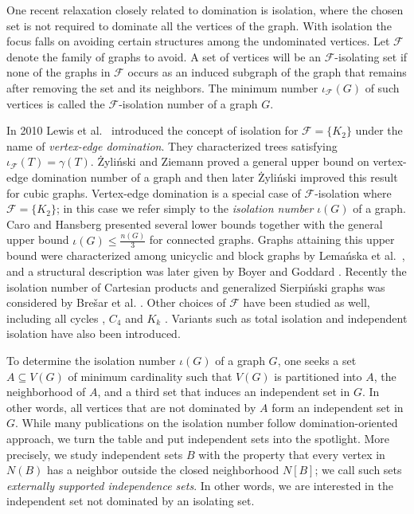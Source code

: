 \documentclass[11pt]{article}
\newcommand{\g}{\gamma}
\newcommand{\io}{\iota}
\begin{document}
One recent relaxation closely related to domination is isolation, where the chosen set is not required to dominate all the vertices of the graph. With isolation the focus falls on avoiding certain structures among the undominated vertices. Let $\mathcal{F}$ denote the family of graphs to avoid. A set of vertices will be an $\mathcal{F}$-isolating set if none of the graphs in $\mathcal{F}$ occurs as an induced subgraph of the graph that remains after removing the set and its neighbors. The minimum number $\io_{\mathcal{F}}(G)$ of such vertices is called the $\mathcal{F}$-isolation number of a graph $G$.

In 2010 Lewis et al.~\cite{LHHF} introduced the concept of isolation for $\mathcal{F}=\{K_2\}$ under the name of \emph{vertex-edge domination}. They characterized trees satisfying $\io_{\mathcal{F}}(T)=\g(T)$. \.{Z}yli\'{n}ski \cite{Zyli} and Ziemann proved a general upper bound on vertex-edge domination number of a graph and then later \.{Z}yli\'{n}ski \cite{ZiZy} improved this result for cubic graphs. Vertex-edge domination is a special case of $\mathcal{F}$-isolation where $\mathcal{F}=\{K_2\}$; in this case we refer simply to the \emph{isolation number} $\io(G)$ of a graph. Caro and Hansberg \cite{caro} presented several lower bounds together with the general upper bound $\io(G)\leq\frac{n(G)}{3}$ for connected graphs. Graphs attaining this upper bound were characterized among unicyclic and block graphs by Lema\'nska et al.~\cite{LMSS}, and a structural description was later given by Boyer and Goddard \cite{BoGo}. Recently the isolation number of Cartesian products and generalized Sierpi\'nski graphs was considered by Bre\v sar et al. \cite{BDJK}. Other choices of $\mathcal{F}$ have been studied as well, including all cycles \cite{Borg}, $C_4$ \cite{BaBS} and $K_k$ \cite{ChCZ}. Variants such as total isolation \cite{BoGH} and independent isolation \cite{BoGo2} have also been introduced.

To determine the isolation number $\io(G)$ of a graph $G$, one seeks a set $A\subseteq V(G)$ of minimum cardinality such that  $V(G)$ is partitioned into $A$, the neighborhood of $A$, and a third set that induces an independent set in $G$. In other words, all vertices that are not dominated by $A$ form an independent set in $G$. While many publications on the isolation number follow domination-oriented approach, we turn the table and put independent sets into the spotlight.
More precisely,  we study independent sets $B$ with the property that every vertex in $N(B)$
has a neighbor outside the closed neighborhood $N[B]$; we call such sets \emph{externally
supported independence sets}. In other words, we are interested in the independent set not dominated by an isolating set.
\end{document}
